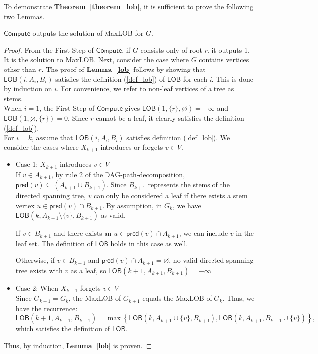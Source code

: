 \documentclass[runningheads]{llncs}
\theoremstyle{plain}
\theoremstyle{definition}
\begin{document}
To demonstrate \textbf{Theorem~\ref{theorem_lob}}, it is sufficient to prove the following two Lemmas.

\begin{lemma}\label{lob}
    $\mathsf{Compute}$ outputs the solution of MaxLOB for $G$.
\end{lemma}

\begin{proof}
    From the First Step of $\mathsf{Compute}$, if $G$ consists only of root $r$, it outputs 1. It is the solution to MaxLOB. Next, consider the case where $G$ contains vertices other than $r$. The proof of \textbf{Lemma~\ref{lob}} follows by showing that $\mathsf{LOB}(i, A_i, B_i)$ satisfies the definition (\ref{def_lob}) of $\mathsf{LOB}$ for each $i$. This is done by induction on $i$. For convenience, we refer to non-leaf vertices of a tree as stems.\\
    When $i=1$, the First Step of $\mathsf{Compute}$ gives $\mathsf{LOB}(1, \{r\}, \varnothing) = -\infty$ and $\mathsf{LOB}(1, \varnothing, \{r\}) = 0$. Since $r$ cannot be a leaf, it clearly satisfies the definition (\ref{def_lob}).\\
    For $i=k$, assume that $\mathsf{LOB}(i, A_i, B_i)$ satisfies definition (\ref{def_lob}). We consider the cases where $X_{k+1}$ introduces or forgets $v \in V$.
    \begin{itemize}
        \item Case 1: $X_{k+1}$ introduces $v \in V$
        \\
        If $v \in A_{k+1}$, by rule 2 of the DAG-path-decomposition, $\mathsf{pred}(v) \subseteq (A_{k+1} \cup B_{k+1})$. Since $B_{k+1}$ represents the stems of the directed spanning tree, $v$ can only be considered a leaf if there exists a stem vertex $u \in \mathsf{pred}(v) \cap B_{k+1}$. By assumption, in $G_k$, we have $\mathsf{LOB}(k, A_{k+1} \setminus \{v\}, B_{k+1})$ as valid.
        
        If $v \in B_{k+1}$ and there exists an $u \in \mathsf{pred}(v) \cap A_{k+1}$, we can include $v$ in the leaf set. The definition of $\mathsf{LOB}$ holds in this case as well.

        Otherwise, if $v \in B_{k+1}$ and $\mathsf{pred}(v) \cap A_{k+1} = \varnothing$, no valid directed spanning tree exists with $v$ as a leaf, so $\mathsf{LOB}(k+1, A_{k+1}, B_{k+1}) = -\infty$.

        \item Case 2: When $X_{k+1}$ forgets $v \in V$
        \\
        Since $G_{k+1} = G_k$, the MaxLOB of $G_{k+1}$ equals the MaxLOB of $G_k$. Thus, we have the recurrence:
        \[
        \mathsf{LOB}(k+1, A_{k+1}, B_{k+1}) = \max \left\{ \mathsf{LOB}(k, A_{k+1} \cup \{v\}, B_{k+1}), \mathsf{LOB}(k, A_{k+1}, B_{k+1} \cup \{v\}) \right\},
        \]
        which satisfies the definition of $\mathsf{LOB}$.
    \end{itemize}
    Thus, by induction, \textbf{Lemma~\ref{lob}} is proven.
\end{proof}
\end{document}
